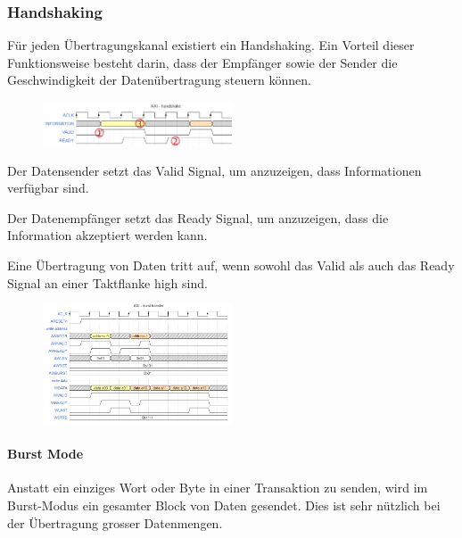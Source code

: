 \begin{multicols}{2}
    \subsubsection{Handshaking}
    Für jeden Übertragungskanal existiert ein Handshaking. Ein Vorteil dieser Funktionsweise besteht darin, dass der Empfänger sowie der Sender die Geschwindigkeit der Datenübertragung steuern können.
     \begin{figure}[H]
     	\includegraphics[width=0.5\textwidth]{images/AXI_Handshaking.png}
     \end{figure}
\end{multicols}
\begin{compactenum}
    \item Der Datensender setzt das Valid Signal, um anzuzeigen, dass Informationen verfügbar sind.
    \item Der Datenempfänger setzt das Ready Signal, um anzuzeigen, dass die Information akzeptiert werden kann.
    \item Eine Übertragung von Daten tritt auf, wenn sowohl das Valid als auch das Ready Signal an einer Taktflanke high sind.
\end{compactenum}

\begin{multicols}{2}
    \begin{figure}[H]
     	\includegraphics[width=0.5\textwidth]{images/AXI_Burst_Transfer.png}
     \end{figure}
    \paragraph{Burst Mode}
    Anstatt ein einziges Wort oder Byte in einer Transaktion zu senden, wird  im Burst-Modus ein gesamter Block von Daten gesendet. Dies ist sehr nützlich bei der Übertragung grosser Datenmengen.
\end{multicols}

